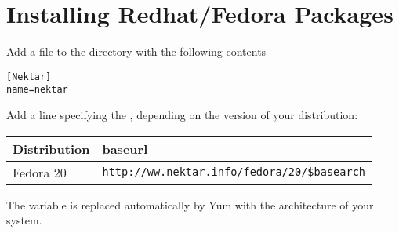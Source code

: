 \section{Installing Redhat/Fedora Packages}
\label{s:installation:redhat}
Add a file to the directory  with the
following contents
\begin{lstlisting}[style=BashInputStyle]
[Nektar]
name=nektar
\end{lstlisting}

Add a line specifying the , depending on the version of your
distribution:

{\small
\begin{center}
\begin{tabular}{ll}
\toprule
Distribution & baseurl \\
\midrule
Fedora 20 & 
   \texttt{http://ww.nektar.info/fedora/20/\$basearch}\\
\bottomrule
\end{tabular}
\end{center}
}

\begin{notebox}
The  variable is replaced automatically by Yum with
the architecture of your system.
\end{notebox}



